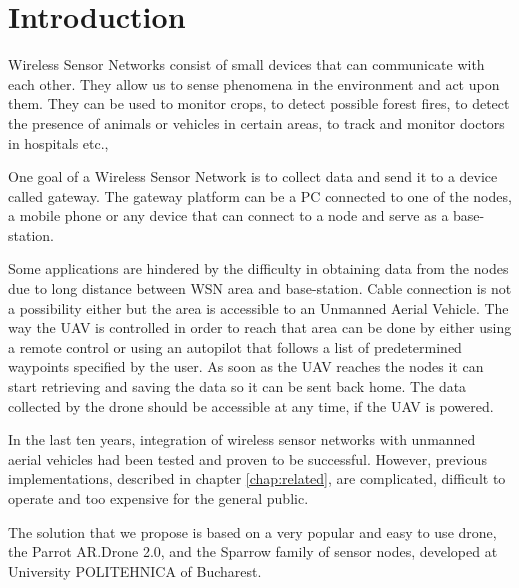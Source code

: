 \normalfont\normalsize
\chapter{Introduction}
 
Wireless Sensor Networks consist of small devices that can communicate with each other. They allow us to sense phenomena in the environment and act upon them. They can be used to monitor crops, to detect possible forest fires, to detect the presence of animals or vehicles in certain areas, to track and monitor doctors in hospitals etc.\cite{baggio2005wireless},\cite{arampatzis2005survey} 

One goal of a Wireless Sensor Network is to collect data and send it to a device called gateway. The gateway platform can be a PC connected to one of the nodes, a mobile phone or any device that can connect to a node and serve as a base-station.


Some applications are hindered by the difficulty in obtaining data from the nodes due to long distance between WSN area and base-station. Cable connection is not a possibility either but the area is accessible to an Unmanned Aerial Vehicle. The way the UAV is controlled in order to reach that area can be done by either using a remote control or using an autopilot that follows a list of predetermined waypoints specified by the user. As soon as the UAV reaches the nodes it can start retrieving and saving the data so it can be sent back home. The data collected by the drone should be accessible at any time, if the UAV is powered.
 
In the last ten years, integration of wireless sensor networks with unmanned aerial vehicles had been tested and proven to be successful. However, previous implementations, described in chapter \ref{chap:related}, are complicated, difficult to operate and too expensive for the general public.

The solution that we propose is based on a very popular and easy to use drone, the Parrot AR.Drone 2.0, and the Sparrow family \cite{voinescu2013lightweight} of sensor nodes, developed at University POLITEHNICA of Bucharest.
